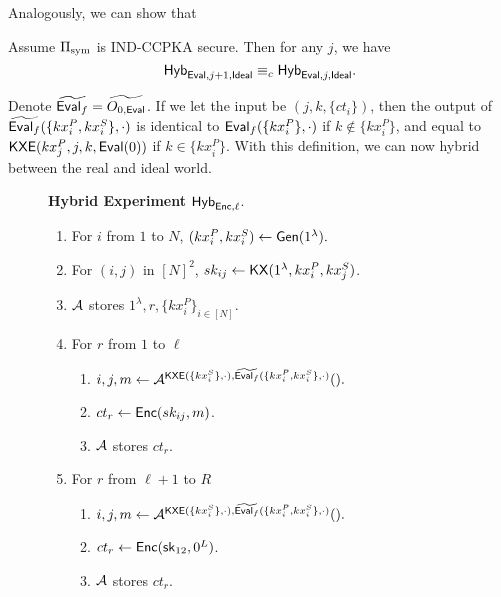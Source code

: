Analogously, we can show that
\begin{lemma}
     Assume $\Pi_{\text{sym}}$ is IND-CCPKA secure. Then for any $j$, we have 
    $$\mathsf{Hyb}_{\mathsf{Eval}, j + 1, \mathsf{Ideal}} \equiv_c \mathsf{Hyb}_{\mathsf{Eval}, j, \mathsf{Ideal}}.$$
\end{lemma}
Denote $\widetilde{\mathsf{Eval}_f} = \widetilde{O_{0, \mathsf{Eval}}}$. If we let the input be $(j, k, \{ct_i\})$, then the output of $\widetilde{\mathsf{Eval}_f}(\{kx_i^P, kx_i^S\}, \cdot)$ is identical to $\mathsf{Eval}_f(\{kx_i^P\}, \cdot)$ if $k \notin \{kx_i^P\}$, and equal to $\mathsf{KXE}(kx_j^P, j, k, \mathsf{Eval}(0))$ if $k \in \{kx_i^P\}$. With this definition, we can now hybrid between the real and ideal world.

\begin{figure}[h!]
\begin{framed}
\textbf{Hybrid Experiment} $\mathsf{Hyb}_{\mathsf{Enc}, \ell}$.
\begin{enumerate}
    \item For $i$ from $1$ to $N$, $(kx_i^P, kx_i^S) \leftarrow \mathsf{Gen}(1^{\lambda}).$
    \item For $(i, j)$ in $[N]^2$, $sk_{ij} \leftarrow \mathsf{KX}(1^{\lambda}, kx_i^P, kx_j^S)$.
    \item $\mathcal{A}$ stores $1^{\lambda}, r, \{kx_i^P\}_{i \in [N]}$.
    \item For $r$ from $1$ to $\ell$
    \begin{enumerate}
        \item $i, j, m \leftarrow \mathcal{A}^{\mathsf{KXE}(\{kx_i^S\}, \cdot), \widetilde{\mathsf{Eval}_f}(\{kx_i^P, kx_i^S\}, \cdot)}().$
        \item $ct_r \leftarrow \mathsf{Enc}(sk_{ij}, m)$.
        \item $\mathcal{A}$ stores $ct_r$.
    \end{enumerate}
    \item For $r$ from $\ell + 1$ to $R$
    \begin{enumerate}
        \item $i, j, m \leftarrow \mathcal{A}^{\mathsf{KXE}(\{kx_i^S\}, \cdot), \widetilde{\mathsf{Eval}_f}(\{kx_i^P, kx_i^S\}, \cdot)}().$
        \item $ct_r \leftarrow \mathsf{Enc}({\mathsf{sk}}_{12}, 0^{L})$.
        \item $\mathcal{A}$ stores $ct_r$.
    \end{enumerate}
\end{enumerate}
\end{framed}
\end{figure}

